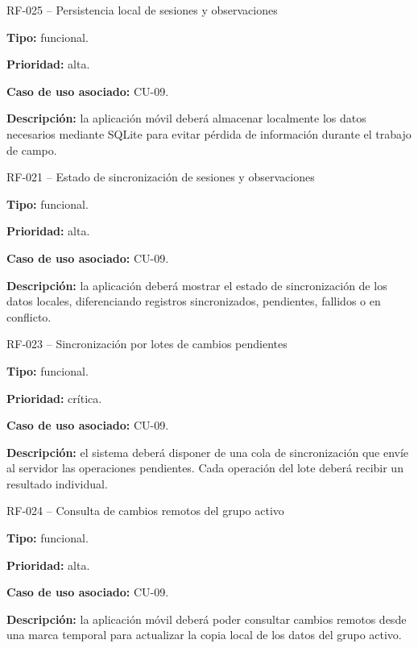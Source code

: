 \begin{requisitocard}{RF-025 -- Persistencia local de sesiones y observaciones}

\textbf{Tipo:} funcional.

\textbf{Prioridad:} alta.

\textbf{Caso de uso asociado:} CU-09.

\textbf{Descripción:} la aplicación móvil deberá almacenar localmente los datos
necesarios mediante SQLite para evitar pérdida de información durante el trabajo
de campo.

\end{requisitocard}

\begin{requisitocard}{RF-021 -- Estado de sincronización de sesiones y observaciones}

\textbf{Tipo:} funcional.

\textbf{Prioridad:} alta.

\textbf{Caso de uso asociado:} CU-09.

\textbf{Descripción:} la aplicación deberá mostrar el estado de sincronización de
los datos locales, diferenciando registros sincronizados, pendientes, fallidos o
en conflicto.

\end{requisitocard}

\begin{requisitocard}{RF-023 -- Sincronización por lotes de cambios pendientes}

\textbf{Tipo:} funcional.

\textbf{Prioridad:} crítica.

\textbf{Caso de uso asociado:} CU-09.

\textbf{Descripción:} el sistema deberá disponer de una cola de sincronización que
envíe al servidor las operaciones pendientes. Cada operación del lote deberá
recibir un resultado individual.

\end{requisitocard}

\begin{requisitocard}{RF-024 -- Consulta de cambios remotos del grupo activo}

\textbf{Tipo:} funcional.

\textbf{Prioridad:} alta.

\textbf{Caso de uso asociado:} CU-09.

\textbf{Descripción:} la aplicación móvil deberá poder consultar cambios remotos
desde una marca temporal para actualizar la copia local de los datos del grupo
activo.

\end{requisitocard}

